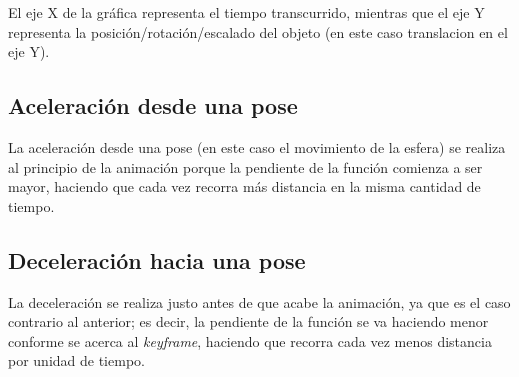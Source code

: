 \documentclass{article}
\begin{document}
El eje X de la gráfica representa el tiempo transcurrido, mientras que el eje Y representa la posición/rotación/escalado del objeto (en este caso translacion en el eje Y).

\subsection{Aceleración desde una pose}
La aceleración desde una pose (en este caso el movimiento de la esfera) se realiza al principio de la animación porque la pendiente de la función comienza a ser mayor, haciendo que cada vez recorra más distancia en la misma cantidad de tiempo.
\subsection{Deceleración hacia una pose}

La deceleración se realiza justo antes de que acabe la animación, ya que es el caso contrario al anterior; es decir, la pendiente de la función se va haciendo menor conforme se acerca al \textit{keyframe}, haciendo que recorra cada vez menos distancia por unidad de tiempo.
\end{document}
